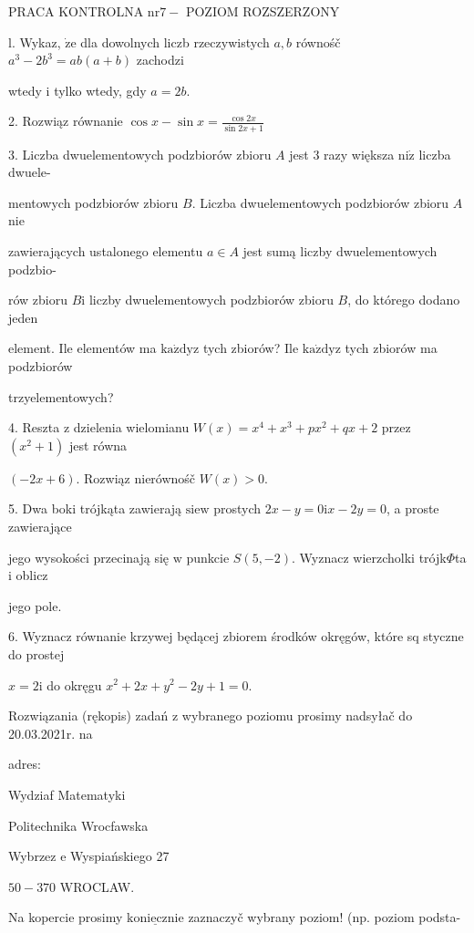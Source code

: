 \documentclass[a4paper,12pt]{article}
\begin{document}
PRACA KONTROLNA $\mathrm{n}\mathrm{r} 7-$ POZIOM ROZSZERZONY

l. Wykaz, $\dot{\mathrm{z}}\mathrm{e}$ dla dowolnych liczb rzeczywistych $a, b$ równośč $a^{3}-2b^{3}=ab(a+b)$ zachodzi

wtedy $\mathrm{i}$ tylko wtedy, gdy $a=2b.$

2. Rozwiąz równanie $\displaystyle \cos x-\sin x=\frac{\cos 2x}{\sin 2x+1}$

3. Liczba dwuelementowych podzbiorów zbioru $A$ jest 3 razy większa $\mathrm{n}\mathrm{i}\dot{\mathrm{z}}$ liczba dwuele-

mentowych podzbiorów zbioru $B$. Liczba dwuelementowych podzbiorów zbioru $A$ nie

zawierających ustalonego elementu $a\in A$ jest sumą liczby dwuelementowych podzbio-

rów zbioru $B\mathrm{i}$ liczby dwuelementowych podzbiorów zbioru $B$, do którego dodano jeden

element. Ile elementów ma $\mathrm{k}\mathrm{a}\dot{\mathrm{z}}\mathrm{d}\mathrm{y}\mathrm{z}$ tych zbiorów? Ile $\mathrm{k}\mathrm{a}\dot{\mathrm{z}}\mathrm{d}\mathrm{y}\mathrm{z}$ tych zbiorów ma podzbiorów

trzyelementowych?

4. Reszta $\mathrm{z}$ dzielenia wielomianu $W(x)=x^{4}+x^{3}+px^{2}+qx+2$ przez $(x^{2}+1)$ jest równa

$(-2x+6)$. Rozwiąz nierównośč $W(x)>0.$

5. Dwa boki trójkąta zawierają $\mathrm{s}\mathrm{i}\mathrm{e}\mathrm{w}$ prostych $2x-y=0\mathrm{i}x-2y=0$, a proste zawierające

jego wysokości przecinają się $\mathrm{w}$ punkcie $S(5,-2)$. Wyznacz wierzcholki trójk$\Phi$ta $\mathrm{i}$ oblicz

jego pole.

6. Wyznacz równanie krzywej będącej zbiorem środków okręgów, które sq styczne do prostej

$x=2\mathrm{i}$ do okręgu $x^{2}+2x+y^{2}-2y+1=0.$

Rozwiązania (rękopis) zadań z wybranego poziomu prosimy nadsyłač do 20.03.2021r. na

adres:

Wydziaf Matematyki

Politechnika Wrocfawska

Wybrzez $\mathrm{e}$ Wyspiańskiego 27

$50-370$ WROCLAW.

Na kopercie prosimy $\underline{\mathrm{k}\mathrm{o}\mathrm{n}\mathrm{i}\mathrm{e}\mathrm{c}\mathrm{z}\mathrm{n}\mathrm{i}\mathrm{e}}$ zaznaczyč wybrany poziom! (np. poziom podsta-
\end{document}
